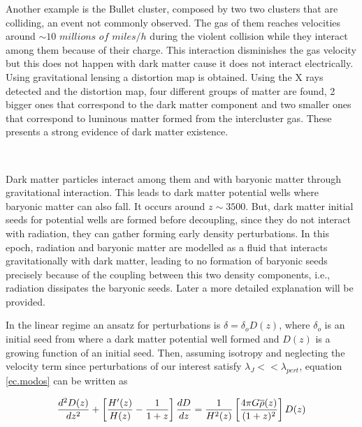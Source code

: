 Another example is the Bullet cluster, composed by two two clusters that are colliding, 
an event not commonly observed. The gas of them reaches velocities around $\sim 10$ $millions$ $of$ $miles/h$ during the violent collision while they interact among them because of their charge. 
This interaction disminishes the gas velocity but this does not happen with dark
matter cause it does not interact electrically. 
Using gravitational lensing a distortion map is obtained. Using the X rays detected
and the distortion map, four different groups of matter are found, 2 bigger ones
that correspond to the dark matter component and two smaller ones that correspond
to luminous matter formed from the intercluster gas. These presents a strong
evidence of dark matter existence. 

\

Dark matter particles interact among them and with baryonic matter through 
gravitational interaction.
This leads to dark matter potential wells where baryonic matter can also fall.  
It occurs around $z \sim 3500$. But, dark matter initial seeds for potential 
wells are formed before decoupling, since they do not interact with radiation,
they can gather forming early density perturbations. In this epoch, radiation
and baryonic matter are modelled as a fluid that interacts gravitationally with 
dark matter, leading to no formation of baryonic seeds precisely because of the 
coupling between this two density components, i.e., radiation dissipates the baryonic
seeds.
Later a more detailed explanation will be provided.


In the linear regime an ansatz for perturbations is $\delta = \delta_oD(z)$,
where $\delta_o$ is an initial seed from where a dark matter potential well formed
and $D(z)$ is a growing function of an initial seed.
Then, assuming isotropy and neglecting the velocity term since perturbations of our
interest satisfy $\lambda_J << \lambda_{pert}$, equation \ref{ec.modos} can be written
as

\begin{equation}
\frac{d^2D(z)}{dz^2}+\left[ \frac{H'(z)}{H(z)} -\frac{1}{1+z}\right]\frac{d D}{d z}
= \frac{1}{H^2(z)}\left[ \frac{4\pi G\overline{\rho}(z)}{(1+z)^2} \right]D(z) 
\nonumber
\end{equation}

